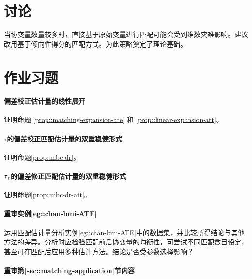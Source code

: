          

\section{讨论}


当协变量数量较多时，直接基于原始变量进行匹配可能会受到维数灾难影响。\citet{rosenbaum1983central}建议改用基于倾向性得分的匹配方式。\citet{abadie2016matching}为此策略奠定了理论基础。 
         
         
         
\section{作业习题}

\paragraph{偏差校正估计量的线性展开}\label{para::linear-bcm-ate}


 证明命题 \ref{prop::matching-expansion-ate} 和 \ref{prop::linear-expansion-att}。 
 
 
 
\paragraph{$\tau$的偏差校正匹配估计量的双重稳健形式}\label{para::dr-mbc-form}

证明命题\ref{prop::mbc-dr}。  


\paragraph{$\tau_\textsc{t}$的偏差修正匹配估计量的双重稳健形式}\label{para::dr-mbc-form-att}

证明命题\ref{prop::mbc-dr-att}。  
 

\paragraph{重审实例\ref{eg::chan-bmi-ATE}}


运用匹配估计量分析实例\ref{eg::chan-bmi-ATE}中的数据集，并比较所得结论与其他方法的差异。分析时应检验匹配前后协变量的均衡性，可尝试不同匹配数目设定，甚至可在匹配后应用多种估计方法。结论是否受参数选择影响？ 

 


\paragraph{重审第\ref{sec::matching-application}节内容}


